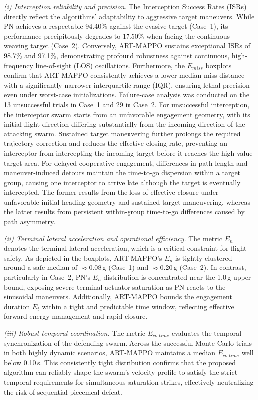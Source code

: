 \documentclass[lettersize,journal]{IEEEtran}
\begin{document}
\emph{(i) Interception reliability and precision.} The Interception Success Rates (ISRs) directly reflect the algorithms' adaptability to aggressive target maneuvers. While PN achieves a respectable 94.40\% against the evasive target (Case~1), its performance precipitously degrades to 17.50\% when facing the continuous weaving target (Case~2). Conversely, ART-MAPPO sustains exceptional ISRs of 98.7\% and 97.1\%, demonstrating profound robustness against continuous, high-frequency line-of-sight (LOS) oscillations. Furthermore, the $E_{miss}$ boxplots confirm that ART-MAPPO consistently achieves a lower median miss distance with a significantly narrower interquartile range (IQR), ensuring lethal precision even under worst-case initializations.
Failure-case analysis was conducted on the 13 unsuccessful trials in
Case~1 and 29 in Case~2. For unsuccessful interception, the interceptor
swarm starts from an unfavorable engagement geometry, with its initial flight
direction differing substantially from the incoming direction of the
attacking swarm. Sustained target maneuvering further prolongs the required
trajectory correction and reduces the effective closing rate, preventing an
interceptor from intercepting the incoming target before it reaches the
high-value target area. For delayed cooperative engagement, differences in
path length and maneuver-induced detours maintain the time-to-go dispersion
within a target group, causing one interceptor to arrive late although the
target is eventually intercepted. The former results from the loss of
effective closure under unfavorable initial heading geometry and sustained
target maneuvering, whereas the latter results from persistent within-group
time-to-go differences caused by path asymmetry.

\emph{(ii) Terminal lateral acceleration and operational efficiency.} The metric $E_n$ denotes the terminal lateral acceleration, which is a critical constraint for flight safety. As depicted in the boxplots, ART-MAPPO's $E_n$ is tightly clustered around a safe median of $\approx0.08$\,g (Case~1) and $\approx0.20$\,g (Case~2). In contrast, particularly in Case~2, PN's $E_n$ distribution is concentrated near the 1.0\,g upper bound, exposing severe terminal actuator saturation as PN reacts to the sinusoidal maneuvers. Additionally, ART-MAPPO bounds the engagement duration $E_t$ within a tight and predictable time window, reflecting effective forward-energy management and rapid closure.

\emph{(iii) Robust temporal coordination.} The metric $E_{co\text{-}time}$ evaluates the temporal synchronization of the defending swarm. Across the successful Monte Carlo trials in both highly dynamic scenarios, ART-MAPPO maintains a median $E_{co\text{-}time}$ well below 0.10\,s. This consistently tight distribution confirms that the proposed algorithm can reliably shape the swarm's velocity profile to satisfy the strict temporal requirements for simultaneous saturation strikes, effectively neutralizing the risk of sequential piecemeal defeat.
\end{document}

